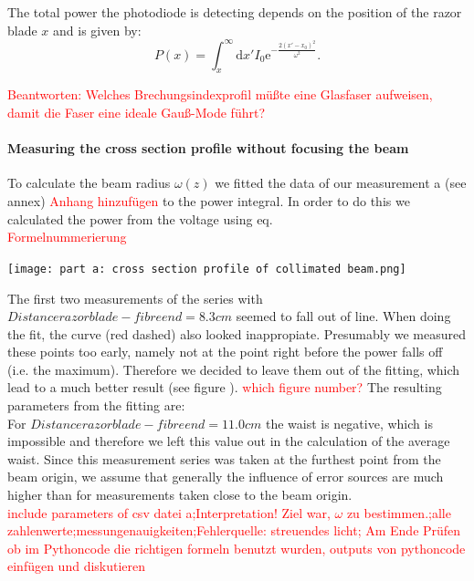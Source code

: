 \documentclass{article}
\begin{document}
The total power the photodiode is detecting depends on the position of the razor blade $x$ and is given by:
\begin{equation}
P(x) = \int_x^\infty\mathrm{d}x' I_0 \mathrm{e}^{-\frac{2(x'-x_0)^2}{\omega^2}}.
\end{equation}

\textcolor{red}{Beantworten: Welches Brechungsindexprofil müßte eine Glasfaser aufweisen, damit die Faser eine ideale Gauß-Mode führt?}

\paragraph{Measuring the cross section profile without focusing the beam}

To calculate the beam radius $\omega (z)$ we fitted the data of our measurement a (see annex)
\textcolor{red}{Anhang hinzufügen} %
to the power integral. In order to do this we calculated the power from the voltage using eq. \\
\textcolor{red}{Formelnummerierung}

\texttt{[image: part a: cross section profile of collimated beam.png]}

The first two measurements of the series with $Distance razor blade - fibre end = 8.3 cm$ seemed to fall out of line. When doing the fit, the curve (red dashed) also looked inappropiate. Presumably we measured these points too early, namely not at the point right before the power falls off (i.e. the maximum). Therefore we decided to leave them out of the fitting, which lead to a much better result (see figure ).
\textcolor{red}{which figure number?}
The resulting parameters from the fitting are: \\

For $Distance razor blade - fibre end = 11.0 cm$ the waist is negative, which is impossible and therefore we left this value out in the calculation of the average waist. Since this measurement series was taken at the furthest point from the beam origin, we assume that generally the influence of error sources are much higher than for measurements taken close to the beam origin.\\

\textcolor{red}{include parameters of csv datei a;Interpretation! Ziel war, $\omega$ zu bestimmen.;alle zahlenwerte;messungenauigkeiten;Fehlerquelle: streuendes licht; Am Ende Prüfen ob im Pythoncode die richtigen formeln benutzt wurden, outputs von pythoncode einfügen und diskutieren}
\end{document}
